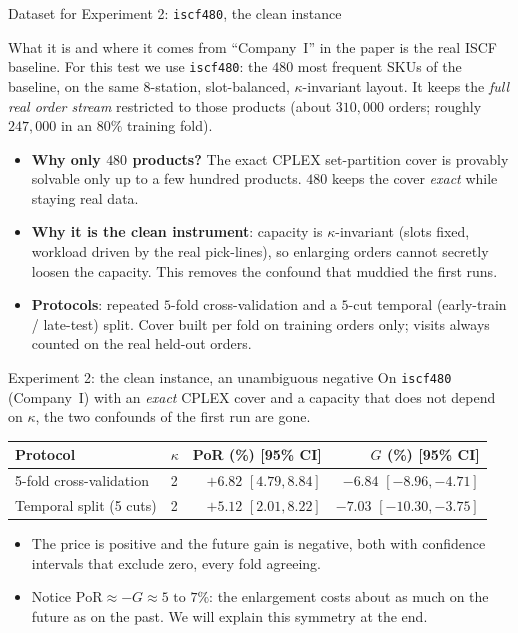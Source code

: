 \documentclass[11pt,aspectratio=169]{beamer}
\newcommand{\bd}[1]{\textcolor{bad}{#1}}
\begin{document}
\begin{frame}{Dataset for Experiment 2: \texttt{iscf480}, the clean instance}
  \begin{block}{What it is and where it comes from}
  ``Company~I'' in the paper is the real ISCF baseline. For this test we use \texttt{iscf480}: the $480$ most frequent SKUs of the baseline, on the same $8$-station, slot-balanced, $\kappa$-invariant layout. It keeps the \emph{full real order stream} restricted to those products (about $310{,}000$ orders; roughly $247{,}000$ in an $80\%$ training fold).
  \end{block}
  \begin{itemize}
    \item \textbf{Why only $480$ products?} The exact CPLEX set-partition cover is provably solvable only up to a few hundred products. $480$ keeps the cover \emph{exact} while staying real data.
    \item \textbf{Why it is the clean instrument}: capacity is $\kappa$-invariant (slots fixed, workload driven by the real pick-lines), so enlarging orders cannot secretly loosen the capacity. This removes the confound that muddied the first runs.
    \item \textbf{Protocols}: repeated $5$-fold cross-validation and a $5$-cut temporal (early-train / late-test) split. Cover built per fold on training orders only; visits always counted on the real held-out orders.
  \end{itemize}
\end{frame}

\begin{frame}{Experiment 2: the clean instance, an unambiguous negative}
  On \texttt{iscf480} (Company~I) with an \emph{exact} CPLEX cover and a capacity that does not depend on $\kappa$, the two confounds of the first run are gone.
  \begin{table}\centering\small
  \begin{tabular}{@{}llrr@{}}
  \toprule
  Protocol & $\kappa$ & PoR (\%) [95\% CI] & $G$ (\%) [95\% CI]\\
  \midrule
  5-fold cross-validation & 2 & \bd{$+6.82$} $[4.79,8.84]$ & \bd{$-6.84$} $[-8.96,-4.71]$\\
  Temporal split (5 cuts) & 2 & \bd{$+5.12$} $[2.01,8.22]$ & \bd{$-7.03$} $[-10.30,-3.75]$\\
  \bottomrule
  \end{tabular}
  \end{table}
  \begin{itemize}
    \item The price is positive and the future gain is \bd{negative}, both with confidence intervals that exclude zero, every fold agreeing.
    \item Notice $\mathrm{PoR}\approx -G\approx 5\text{ to }7\%$: the enlargement costs about as much on the future as on the past. We will explain this symmetry at the end.
  \end{itemize}
\end{frame}
\end{document}
